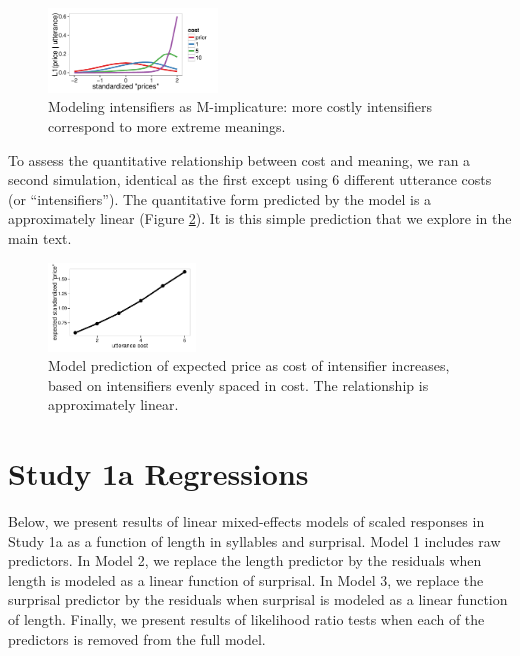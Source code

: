 \begin{appendices}
\begin{figure}[htb]
\begin{center}
\includegraphics[width=0.4\textwidth]{model_results.pdf}
\end{center}
\caption{Modeling intensifiers as M-implicature: more costly intensifiers correspond to more extreme meanings.} 
\label{model}
\end{figure}

To assess the quantitative relationship between cost and meaning, we ran a second simulation, identical as the first except using 6 different utterance costs (or ``intensifiers'').
The quantitative form predicted by the model is a approximately linear (Figure \ref{model-heights}).
It is this simple prediction that we explore in the main text.


\begin{figure}[htb]
\begin{center}\includegraphics[width=0.35\textwidth]{height-by-cost.pdf}
\end{center}
\caption{Model prediction of expected price as cost of intensifier increases, based on intensifiers evenly spaced in cost. The relationship is approximately linear.} 
\label{model-heights}
\end{figure}


\section{Study 1a Regressions}

Below, we present results of linear mixed-effects models of scaled responses in Study 1a as a function of length in syllables and surprisal.
Model 1 includes raw predictors.
In Model 2, we replace the length predictor by the residuals when length is modeled as a linear function of surprisal.
In Model 3, we replace the surprisal predictor by the residuals when surprisal is modeled as a linear function of length.
Finally, we present results of likelihood ratio tests when each of the predictors is removed from the full model.


\end{appendices}
